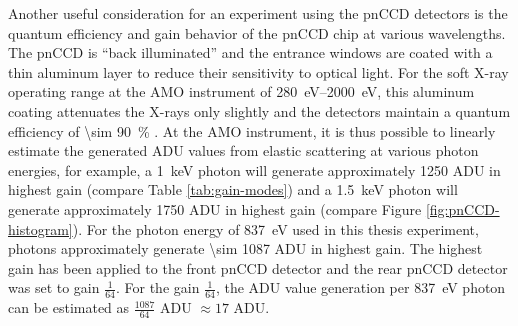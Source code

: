 Another useful consideration for an experiment using the pnCCD detectors is the quantum efficiency and gain behavior of the pnCCD chip at various wavelengths. The pnCCD is ``back illuminated'' and the entrance windows are coated with a thin aluminum layer to reduce their sensitivity to optical light. For the soft X-ray operating range at the AMO instrument of \SIrange{280}{2000}{\electronvolt}, this aluminum coating attenuates the X-rays only slightly and the detectors maintain a quantum efficiency of \SI{\sim 90}{\percent} \cite{Strueder-2010-NIMPA}. At the AMO instrument, it is thus possible to linearly estimate the generated ADU values from elastic scattering at various photon energies, for example, a \SI{1}{\kilo\electronvolt} photon will generate approximately \num{1250} ADU in highest gain (compare Table \ref{tab:gain-modes}) and a \SI{1.5}{\kilo\electronvolt} photon will generate approximately \num{1750} ADU in highest gain (compare Figure \ref{fig:pnCCD-histogram}). For the photon energy of \SI{837}{\electronvolt} used in this thesis experiment, photons approximately generate \num{\sim 1087} ADU in highest gain. The highest gain has been applied to the front pnCCD detector and the rear pnCCD detector was set to gain $\tfrac{1}{64}$. For the gain $\tfrac{1}{64}$, the ADU value generation per \SI{837}{\electronvolt} photon can be estimated as $\tfrac{1087}{64}$ ADU $\approx 17$ ADU.
%
%
%
%
%
